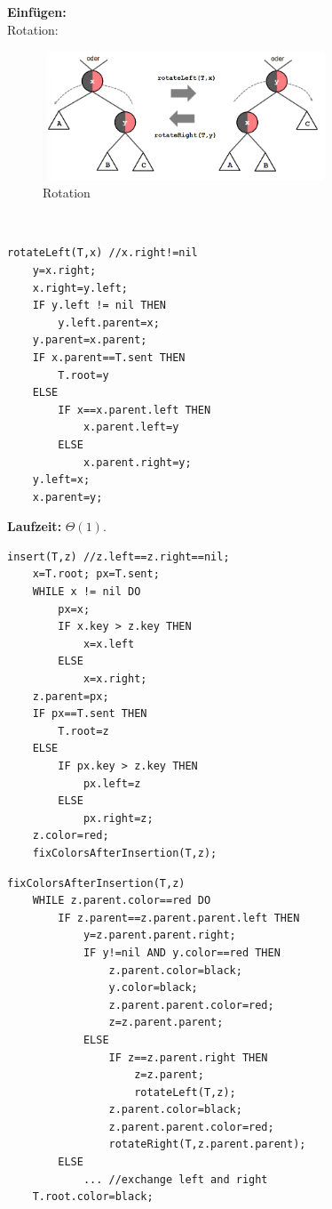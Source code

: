 \documentclass{article}
\begin{document}
            \textbf{Einfügen:}\\
            Rotation: \\
            \begin{figure}[ht]
                \centering
                \includegraphics[width=0.75\textwidth]{Bilder/RSRotation.png}
                \caption{Rotation}
                \label{fig:RSRotation}
            \end{figure}\\
            \newpage
            \begin{lstlisting}[style=pseudocode]
rotateLeft(T,x) //x.right!=nil
    y=x.right;
    x.right=y.left;
    IF y.left != nil THEN
        y.left.parent=x;
    y.parent=x.parent;
    IF x.parent==T.sent THEN
        T.root=y
    ELSE
        IF x==x.parent.left THEN
            x.parent.left=y
        ELSE
            x.parent.right=y;
    y.left=x;
    x.parent=y;
            \end{lstlisting}
            \textbf{Laufzeit:} $\Theta(1)$.
            \begin{lstlisting}[style=pseudocode]
insert(T,z) //z.left==z.right==nil;
    x=T.root; px=T.sent;
    WHILE x != nil DO
        px=x;
        IF x.key > z.key THEN
            x=x.left
        ELSE
            x=x.right;
    z.parent=px;
    IF px==T.sent THEN
        T.root=z
    ELSE
        IF px.key > z.key THEN
            px.left=z
        ELSE
            px.right=z;
    z.color=red;
    fixColorsAfterInsertion(T,z);
            \end{lstlisting}
            \begin{lstlisting}[style=pseudocode]
fixColorsAfterInsertion(T,z)
    WHILE z.parent.color==red DO
        IF z.parent==z.parent.parent.left THEN
            y=z.parent.parent.right;
            IF y!=nil AND y.color==red THEN
                z.parent.color=black;
                y.color=black;
                z.parent.parent.color=red;
                z=z.parent.parent;
            ELSE
                IF z==z.parent.right THEN
                    z=z.parent;
                    rotateLeft(T,z);
                z.parent.color=black;
                z.parent.parent.color=red;
                rotateRight(T,z.parent.parent);
        ELSE
            ... //exchange left and right
    T.root.color=black;
            \end{lstlisting}
\end{document}
